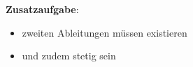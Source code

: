 

\label{LastTask}

\newpage



\begin{enumerate}











\end{enumerate}

\textbf{Zusatzaufgabe}:

\begin{itemize}
	\item zweiten Ableitungen müssen existieren
	\item und zudem stetig sein
\end{itemize}


